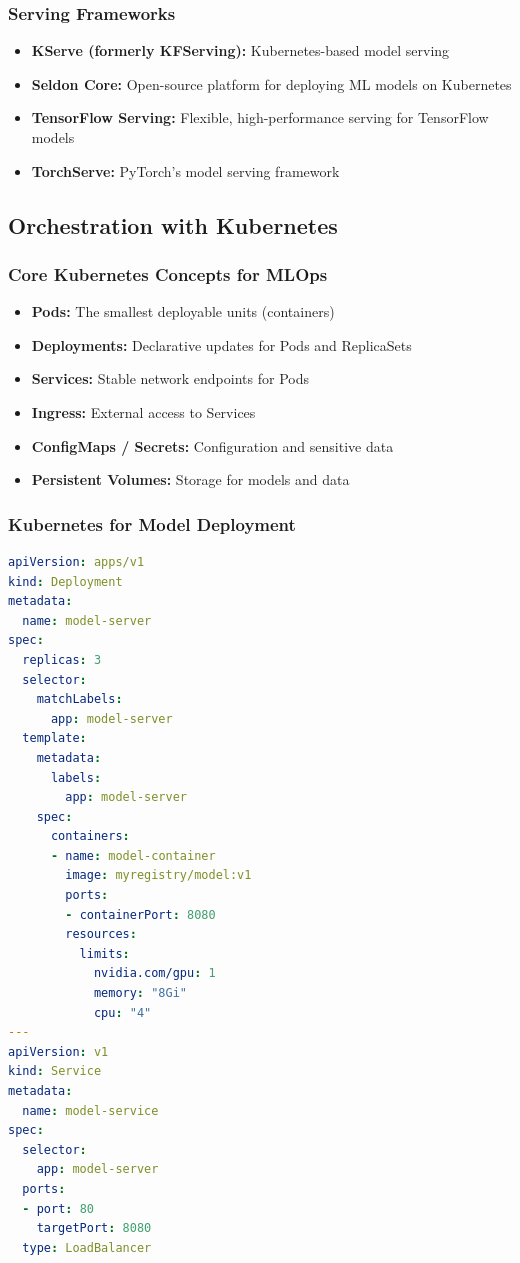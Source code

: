 \documentclass[11pt]{article}
\begin{document}
\subsubsection{Serving Frameworks}
\begin{itemize}
    \item \textbf{KServe (formerly KFServing):} Kubernetes-based model serving
    \item \textbf{Seldon Core:} Open-source platform for deploying ML models on Kubernetes
    \item \textbf{TensorFlow Serving:} Flexible, high-performance serving for TensorFlow models
    \item \textbf{TorchServe:} PyTorch's model serving framework
\end{itemize}

\subsection{Orchestration with Kubernetes}

\subsubsection{Core Kubernetes Concepts for MLOps}
\begin{itemize}
    \item \textbf{Pods:} The smallest deployable units (containers)
    \item \textbf{Deployments:} Declarative updates for Pods and ReplicaSets
    \item \textbf{Services:} Stable network endpoints for Pods
    \item \textbf{Ingress:} External access to Services
    \item \textbf{ConfigMaps / Secrets:} Configuration and sensitive data
    \item \textbf{Persistent Volumes:} Storage for models and data
\end{itemize}

\subsubsection{Kubernetes for Model Deployment}
\lstset{style=yamlstyle}
\begin{lstlisting}[caption=Kubernetes Deployment YAML, language=yaml]
apiVersion: apps/v1
kind: Deployment
metadata:
  name: model-server
spec:
  replicas: 3
  selector:
    matchLabels:
      app: model-server
  template:
    metadata:
      labels:
        app: model-server
    spec:
      containers:
      - name: model-container
        image: myregistry/model:v1
        ports:
        - containerPort: 8080
        resources:
          limits:
            nvidia.com/gpu: 1
            memory: "8Gi"
            cpu: "4"
---
apiVersion: v1
kind: Service
metadata:
  name: model-service
spec:
  selector:
    app: model-server
  ports:
  - port: 80
    targetPort: 8080
  type: LoadBalancer
\end{lstlisting}
\end{document}

